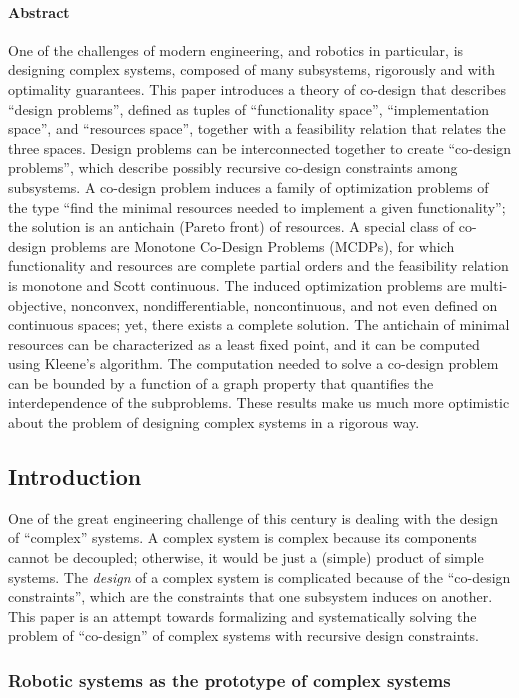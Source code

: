 \paragraph{Abstract}
One of the challenges of modern engineering, and robotics in particular,
is designing complex systems, composed of many subsystems, rigorously
and with optimality guarantees. This paper introduces a theory of
co-design that describes ``design problems'', defined as tuples
of ``functionality space'', ``implementation space'', and ``resources
space'', together with a feasibility relation that relates the three
spaces. Design problems can be interconnected together to create ``co-design
problems'', which describe possibly recursive co-design constraints
among subsystems. A co-design problem induces a family of optimization
problems of the type ``find the minimal resources needed to implement
a given functionality''; the solution is an antichain (Pareto front)
of resources. A special class of co-design problems are Monotone Co-Design
Problems (MCDPs), for which functionality and resources are complete
partial orders and the feasibility relation is monotone and Scott
continuous. The induced optimization problems are multi-objective,
nonconvex, nondifferentiable, noncontinuous, and not even defined
on continuous spaces; yet, there exists a complete solution. The antichain
of minimal resources can be characterized as a least fixed point,
and it can be computed using Kleene's algorithm. The computation needed
to solve a co-design problem can be bounded by a function of a graph
property that quantifies the interdependence of the subproblems. These
results make us much more optimistic about the problem of designing
complex systems in a rigorous way.


\subsection{Introduction}
One of the great engineering challenge of this
century is dealing with the design of ``complex'' systems. A complex
system is complex because its components cannot be decoupled; otherwise,
it would be just a (simple) product of simple systems. The \emph{design}
of a complex system is complicated because of the ``co-design constraints'',
which are the constraints that one subsystem induces on another. This
paper is an attempt towards formalizing and systematically solving
the problem of ``co-design'' of complex systems with recursive design
constraints.

\subsubsection{Robotic systems as the prototype of complex systems}

